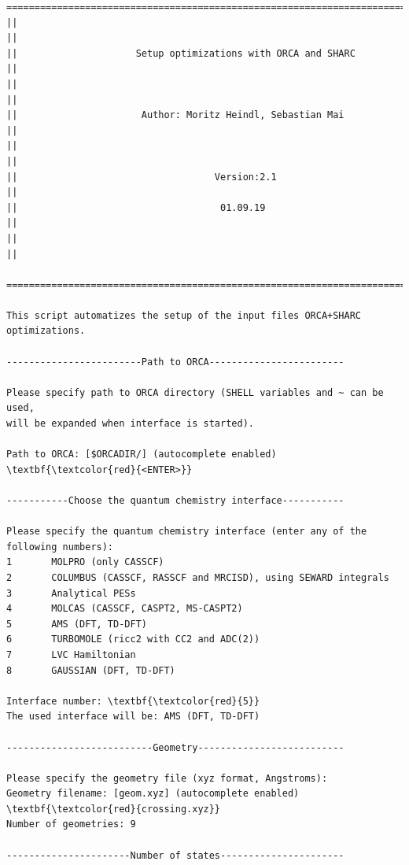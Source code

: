 \documentclass[a4paper,11pt,DIV=15,openany]{scrbook}
\begin{document}
\begin{oframed}
\footnotesize\begin{Verbatim}[commandchars=\\\{\}]
  ================================================================================
||                                                                                ||
||                     Setup optimizations with ORCA and SHARC                    ||
||                                                                                ||
||                      Author: Moritz Heindl, Sebastian Mai                      ||
||                                                                                ||
||                                   Version:2.1                                  ||
||                                    01.09.19                                    ||
||                                                                                ||
  ================================================================================

This script automatizes the setup of the input files ORCA+SHARC optimizations. 
  
------------------------Path to ORCA------------------------

Please specify path to ORCA directory (SHELL variables and ~ can be used, 
will be expanded when interface is started).

Path to ORCA: [$ORCADIR/] (autocomplete enabled) \textbf{\textcolor{red}{<ENTER>}}

-----------Choose the quantum chemistry interface-----------

Please specify the quantum chemistry interface (enter any of the following numbers):
1       MOLPRO (only CASSCF)
2       COLUMBUS (CASSCF, RASSCF and MRCISD), using SEWARD integrals
3       Analytical PESs
4       MOLCAS (CASSCF, CASPT2, MS-CASPT2)
5       AMS (DFT, TD-DFT)
6       TURBOMOLE (ricc2 with CC2 and ADC(2))
7       LVC Hamiltonian
8       GAUSSIAN (DFT, TD-DFT)

Interface number: \textbf{\textcolor{red}{5}}
The used interface will be: AMS (DFT, TD-DFT)

--------------------------Geometry--------------------------

Please specify the geometry file (xyz format, Angstroms):
Geometry filename: [geom.xyz] (autocomplete enabled) \textbf{\textcolor{red}{crossing.xyz}}
Number of geometries: 9

----------------------Number of states----------------------



\end{Verbatim}
\end{oframed}
\end{document}
